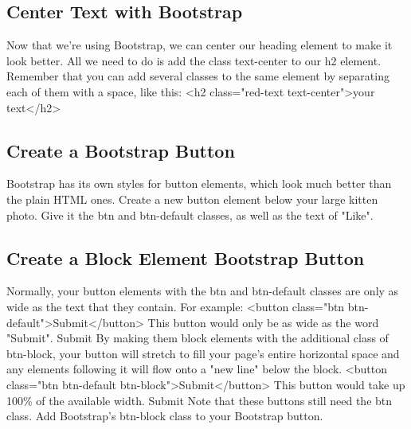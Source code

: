 \documentclass{article}%
\begin{document}
%
\subsection{Center Text with Bootstrap}%
\label{subsec:CenterTextwithBootstrap}%
Now that we're using Bootstrap, we can center our heading element to make it look better. All we need to do is add the class text{-}center to our h2 element.\newline%
Remember that you can add several classes to the same element by separating each of them with a space, like this:\newline%
<h2 class="red{-}text text{-}center">your text</h2>\newline%

%
\subsection{Create a Bootstrap Button}%
\label{subsec:CreateaBootstrapButton}%
Bootstrap has its own styles for button elements, which look much better than the plain HTML ones.\newline%
Create a new button element below your large kitten photo. Give it the btn and btn{-}default classes, as well as the text of "Like".\newline%

%
\subsection{Create a Block Element Bootstrap Button}%
\label{subsec:CreateaBlockElementBootstrapButton}%
Normally, your button elements with the btn and btn{-}default classes are only as wide as the text that they contain. For example:\newline%
<button class="btn btn{-}default">Submit</button>\newline%
This button would only be as wide as the word "Submit".\newline%
Submit\newline%
By making them block elements with the additional class of btn{-}block, your button will stretch to fill your page's entire horizontal space and any elements following it will flow onto a "new line" below the block.\newline%
<button class="btn btn{-}default btn{-}block">Submit</button>\newline%
This button would take up 100\% of the available width.\newline%
Submit\newline%
Note that these buttons still need the btn class.\newline%
Add Bootstrap's btn{-}block class to your Bootstrap button.\newline%
\end{document}
